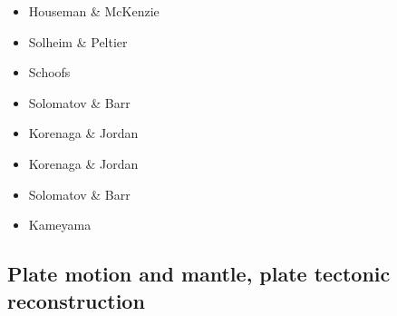 \begin{scriptsize}
\begin{itemize}
\item[\nineteeneightytwo] Houseman \& McKenzie \cite{homc82}
\item[\nineteenninety] Solheim \& Peltier \cite{sope90}
\item[\twothousand] Schoofs \etal \cite{scth00}
\item[\twothousandsix] Solomatov \& Barr \cite{soba06}
\item[\twothousandtwo] Korenaga \& Jordan \cite{kojo02}
\item[\twothousandtwo] Korenaga \& Jordan \cite{kojo03}
\item[\twothousandseven] Solomatov \& Barr \cite{soba07}
\item[\twothousandfifteen] Kameyama \etal \cite{kamo15}
\end{itemize}
\end{scriptsize}

\subsection{Plate motion and mantle, plate tectonic reconstruction}

